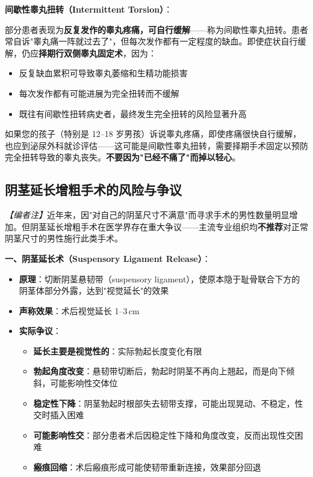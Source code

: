 \begin{enumerate}
\vspace{0.5em}
\noindent\textbf{间歇性睾丸扭转（Intermittent Torsion）}：

部分患者表现为\textbf{反复发作的睾丸疼痛，可自行缓解}——称为间歇性睾丸扭转。患者常自诉"睾丸痛一阵就过去了"，但每次发作都有一定程度的缺血。即使症状自行缓解，仍应\textbf{择期行双侧睾丸固定术}，因为：
\begin{itemize}[leftmargin=2cm]
	\item 反复缺血累积可导致睾丸萎缩和生精功能损害
	\item 每次发作都有可能进展为完全扭转而不缓解
	\item 既往有间歇性扭转病史者，最终发生完全扭转的风险显著升高
\end{itemize}

\begin{tcolorbox}[colback=pink!5!white,colframe=red!50!black,title=贴心小叮咛]
如果您的孩子（特别是 12--18 岁男孩）诉说睾丸疼痛，即使疼痛很快自行缓解，也应到泌尿外科就诊评估——这可能是间歇性睾丸扭转，需要择期手术固定以预防完全扭转导致的睾丸丧失。\textbf{不要因为"已经不痛了"而掉以轻心}。
\end{tcolorbox}

\subsection{阴茎延长增粗手术的风险与争议}
\label{subsec:penile_enlargement}

\noindent\textit{【编者注】}近年来，因"对自己的阴茎尺寸不满意"而寻求手术的男性数量明显增加。但阴茎延长增粗手术在医学界存在重大争议——主流专业组织均\textbf{不推荐}对正常阴茎尺寸的男性施行此类手术。

\vspace{0.5em}
\noindent\textbf{一、阴茎延长术（Suspensory Ligament Release）}：

\begin{itemize}[leftmargin=2cm]
	\item \textbf{原理}：切断阴茎悬韧带（suspensory ligament），使原本隐于耻骨联合下方的阴茎体部分外露，达到"视觉延长"的效果
	\item \textbf{声称效果}：术后视觉延长 1--3\,cm
	\item \textbf{实际争议}：
	\begin{itemize}
		\item \textbf{延长主要是视觉性的}：实际勃起长度变化有限
		\item \textbf{勃起角度改变}：悬韧带切断后，勃起时阴茎不再向上翘起，而是向下倾斜，可能影响性交体位
		\item \textbf{稳定性下降}：阴茎勃起时根部失去韧带支撑，可能出现晃动、不稳定，性交时插入困难
		\item \textbf{可能影响性交}：部分患者术后因稳定性下降和角度改变，反而出现性交困难
		\item \textbf{瘢痕回缩}：术后瘢痕形成可能使韧带重新连接，效果部分回退
	\end{itemize}
\end{itemize}


\end{enumerate}
